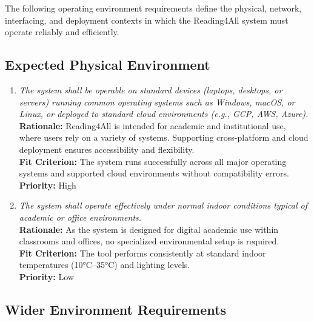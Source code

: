 \documentclass[12pt]{article}
\begin{document}
The following operating environment requirements define the physical,
network, interfacing, and deployment contexts in which the
Reading4All system must operate reliably and efficiently.

\subsection{Expected Physical Environment}

\begin{enumerate}[label=OER-EP\arabic*., wide=0pt, leftmargin=*]
  \item \emph{The system shall be operable on standard devices
      (laptops, desktops, or servers) running common operating systems
      such as Windows, macOS, or Linux, or deployed to standard cloud
    environments (e.g., GCP, AWS, Azure).}\\[2mm]
    {\bf Rationale:} Reading4All is intended for academic and
    institutional use, where users rely on a variety of systems.
    Supporting cross-platform and cloud deployment ensures
    accessibility and flexibility.\\
    {\bf Fit Criterion:} The system runs successfully across all
    major operating systems and supported cloud environments without
    compatibility errors.\\
    {\bf Priority:} High

  \item \emph{The system shall operate effectively under normal
    indoor conditions typical of academic or office environments.}\\[2mm]
    {\bf Rationale:} As the system is designed for digital academic
    use within classrooms and offices, no specialized environmental
    setup is required.\\
    {\bf Fit Criterion:} The tool performs consistently at standard
    indoor temperatures (10°C–35°C) and lighting levels.\\
    {\bf Priority:} Low
\end{enumerate}

\subsection{Wider Environment Requirements}
\end{document}
